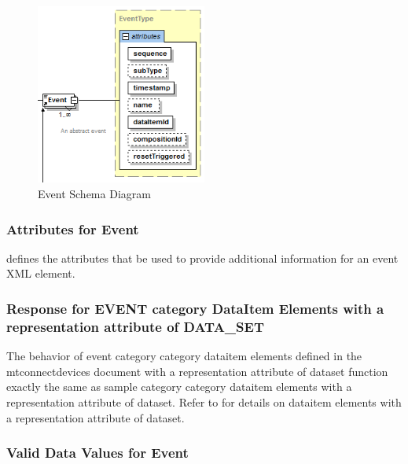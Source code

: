 \begin{figure}[ht]
  \centering
  \includegraphics[width=0.5\textwidth]{figures/event-schema-diagram.png}
  \caption{Event Schema Diagram}
  \label{fig:event-schema-diagram}
\end{figure}

\FloatBarrier

\subsubsection{Attributes for Event}

 defines the attributes that \may be used to provide additional information for an \gls{event} XML element.



  

\subsubsection{Response for EVENT category DataItem Elements with a representation attribute of DATA_SET}
\label{sec:Response for EVENT category DataItem Elements with a representation attribute of DATA_SET}

The behavior of \gls{event category} category \gls{dataitem} elements defined in the \gls{mtconnectdevices} document with a \gls{representation} attribute of \gls{dataset} function exactly the same as \gls{sample category} category \gls{dataitem} elements with a \gls{representation} attribute of \gls{dataset}. Refer to  for details on \gls{dataitem} elements with a \gls{representation} attribute of \gls{dataset}.  


\subsubsection{Valid Data Values for Event}

